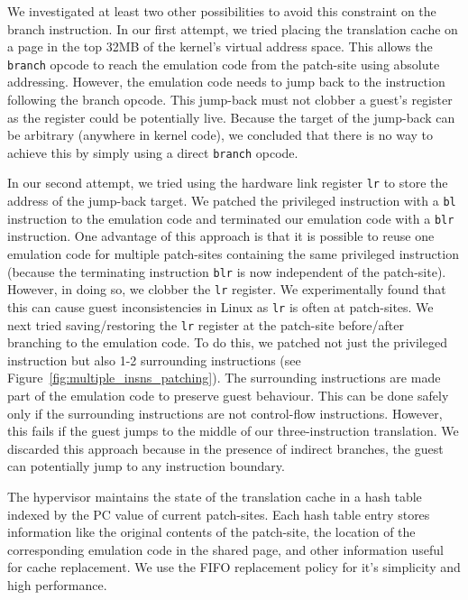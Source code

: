 \documentclass[10pt,twocolumn]{article}
\begin{document}
We investigated at least two other possibilities to avoid this constraint
on the branch instruction. In our first attempt, we tried placing the
translation cache on a page in the top 32MB of the kernel's virtual address
space. This allows the {\tt branch} opcode to reach the emulation code from
the patch-site using absolute addressing. However, the emulation code needs to
jump back to the instruction following the branch opcode. This jump-back must not
clobber a guest's register as the register could be potentially live. Because
the target of the jump-back can be arbitrary (anywhere in kernel code), we concluded
that there is no way to achieve this by simply using a direct {\tt branch} opcode.

In our second attempt, we tried using the hardware link register {\tt lr} to store
the address
of the jump-back target. We patched the privileged instruction with a {\tt bl}
instruction to the emulation code and terminated our emulation code with a {\tt blr}
instruction. One advantage of this approach is that it is possible to
reuse one emulation code
for multiple patch-sites containing the same privileged instruction (because the
terminating instruction {\tt blr} is now independent of the patch-site). However, in
doing so, we
clobber the {\tt lr} register. We experimentally found that this can cause
guest inconsistencies in Linux as {\tt lr} is often at patch-sites.
We next tried saving/restoring the
{\tt lr} register at the patch-site before/after branching to the emulation code.
To do this, we patched not just the privileged instruction but also 1-2
surrounding instructions (see Figure~\ref{fig:multiple_insns_patching}). The
surrounding instructions are made part of the emulation code to preserve
guest behaviour. This can
be done safely only if the surrounding instructions are not control-flow instructions.
However, this fails if the guest jumps to the middle of our
three-instruction translation. We discarded this approach because in the presence
of indirect branches, the guest can potentially jump to any instruction boundary.

The hypervisor maintains the state of the translation cache in
a hash table indexed by the PC value of current patch-sites. Each hash table
entry stores information like the original contents of the patch-site,
the location of the corresponding emulation code in the shared page, and other
information useful
for cache replacement. We use the FIFO replacement policy for it's simplicity
and high performance.
\end{document}
